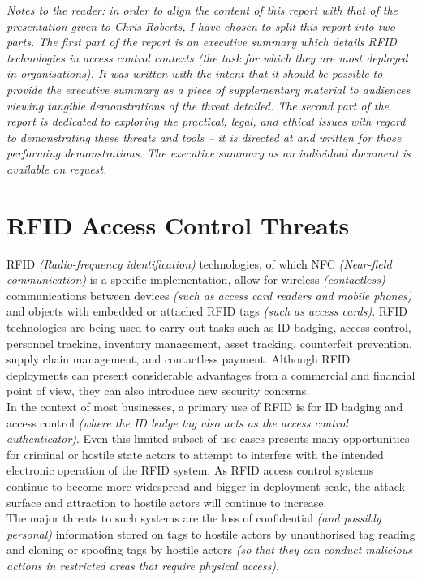 \textit{Notes to the reader: in order to align the content of this report with that of the presentation given to Chris Roberts, I have chosen to split this report into two parts. The first part of the report is an executive summary which details RFID technologies in access control contexts (the task for which they are most deployed in organisations). It was written with the intent that it should be possible to provide the executive summary as a piece of supplementary material to audiences viewing tangible demonstrations of the threat detailed. The second part of the report is dedicated to exploring the practical, legal, and ethical issues with regard to demonstrating these threats and tools -- it is directed at and written for those performing demonstrations. The executive summary as an individual document is available on request.}

\section{RFID Access Control Threats}
RFID \textit{(Radio-frequency identification)} technologies, of which NFC \textit{(Near-field communication)} is a specific implementation, allow for wireless \textit{(contactless)} communications between devices \textit{(such as access card readers and mobile phones)} and objects with embedded or attached RFID tags \textit{(such as access cards)}. RFID technologies are being used to carry out tasks such as ID badging, access control, personnel tracking, inventory management, asset tracking, counterfeit prevention, supply chain management, and contactless payment. Although RFID deployments can present considerable advantages from a commercial and financial point of view, they can also introduce new security concerns.\\

\noindent In the context of most businesses, a primary use of RFID is for ID badging and access control \textit{(where the ID badge tag also acts as the access control authenticator)}. Even this limited subset of use cases presents many opportunities for criminal or hostile state actors to attempt to interfere with the intended electronic operation of the RFID system. As RFID access control systems continue to become more widespread and bigger in deployment scale, the attack surface and attraction to hostile actors will continue to increase.\\

\noindent The major threats to such systems are the loss of confidential \textit{(and possibly personal)} information stored on tags to hostile actors by unauthorised tag reading and cloning or spoofing tags by hostile actors \textit{(so that they can conduct malicious actions in restricted areas that require physical access)}.\\

